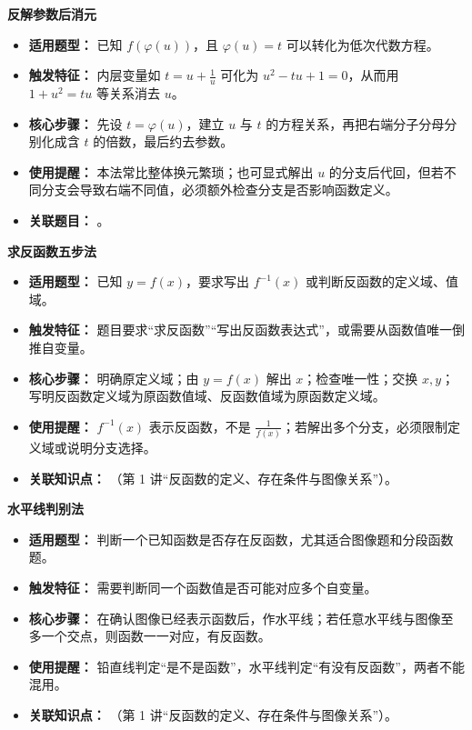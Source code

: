 \begin{knowledgeBox}
\textbf{反解参数后消元}

\begin{itemize}
  \item \textbf{适用题型：} 已知 \(f(\varphi(u))\)，且 \(\varphi(u)=t\) 可以转化为低次代数方程。
  \item \textbf{触发特征：} 内层变量如 \(t=u+\frac{1}{u}\) 可化为 \(u^2-tu+1=0\)，从而用 \(1+u^2=tu\) 等关系消去 \(u\)。
  \item \textbf{核心步骤：} 先设 \(t=\varphi(u)\)，建立 \(u\) 与 \(t\) 的方程关系，再把右端分子分母分别化成含 \(t\) 的倍数，最后约去参数。
  \item \textbf{使用提醒：} 本法常比整体换元繁琐；也可显式解出 \(u\) 的分支后代回，但若不同分支会导致右端不同值，必须额外检查分支是否影响函数定义。
  \item \textbf{关联题目：} 。
\end{itemize}

\textbf{求反函数五步法}

\begin{itemize}
  \item \textbf{适用题型：} 已知 \(y=f(x)\)，要求写出 \(f^{-1}(x)\) 或判断反函数的定义域、值域。
  \item \textbf{触发特征：} 题目要求“求反函数”“写出反函数表达式”，或需要从函数值唯一倒推自变量。
  \item \textbf{核心步骤：} 明确原定义域；由 \(y=f(x)\) 解出 \(x\)；检查唯一性；交换 \(x,y\)；写明反函数定义域为原函数值域、反函数值域为原函数定义域。
  \item \textbf{使用提醒：} \(f^{-1}(x)\) 表示反函数，不是 \(\frac{1}{f(x)}\)；若解出多个分支，必须限制定义域或说明分支选择。
  \item \textbf{关联知识点：} （第 1 讲“反函数的定义、存在条件与图像关系”）。
\end{itemize}

\textbf{水平线判别法}

\begin{itemize}
  \item \textbf{适用题型：} 判断一个已知函数是否存在反函数，尤其适合图像题和分段函数题。
  \item \textbf{触发特征：} 需要判断同一个函数值是否可能对应多个自变量。
  \item \textbf{核心步骤：} 在确认图像已经表示函数后，作水平线；若任意水平线与图像至多一个交点，则函数一一对应，有反函数。
  \item \textbf{使用提醒：} 铅直线判定“是不是函数”，水平线判定“有没有反函数”，两者不能混用。
  \item \textbf{关联知识点：} （第 1 讲“反函数的定义、存在条件与图像关系”）。
\end{itemize}


\end{knowledgeBox}
